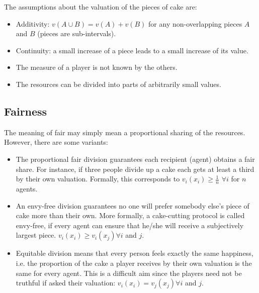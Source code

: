 The assumptions about the valuation of the pieces of cake are:
\begin{itemize}
\item Additivity: $v(A \cup B) = v(A) + v(B)$ for any non-overlapping pieces $A$ and $B$
(pieces are sub-intervals). 
\item 
Continuity: a small increase of a piece leads to a small increase of its value. 
\item The measure of a player is not known by the others.
\item The resources can be divided into parts of arbitrarily small values.
\end{itemize}

\subsection{Fairness}

The meaning of fair may simply mean a proportional sharing of the resources. 
However, there are some variants:

\begin{itemize}
\item The proportional fair division guarantees each recipient (agent) obtains a fair share. 
For instance, if three people divide up a cake each gets at least a third by their own valuation. 
Formally, this corresponds to $v_i(x_i) \geq \frac{1}{n}$ $\forall i$ for $n$ agents.
\item An envy-free division guarantees no one will prefer somebody else's piece of cake more than their own. More formally, 
a cake-cutting protocol is called envy-free, if every agent can ensure that he/she will receive a subjectively largest piece.
 $v_i(x_i) \geq v_i(x_j) \forall i$ and $j$.
\item Equitable division means that every person feels exactly the same happiness, 
i.e. the proportion of the cake a player receives by their own valuation is the same for every agent. 
This is a difficult aim since the players need not be truthful if asked their valuation:
 $v_i(x_i) = v_j(x_j) \forall i$ and $j$.
 \end{itemize}


